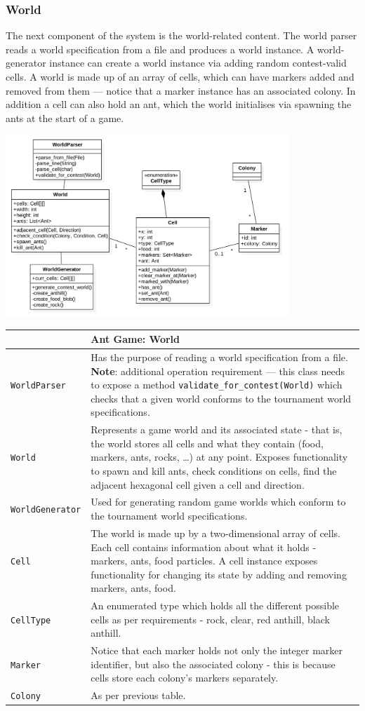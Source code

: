 \documentclass[11pt]{article}
\begin{document}
\subsubsection{World}

The next component of the system is the world-related content. The world parser reads a world specification from a file and produces a world instance. A world-generator instance can create a world instance via adding random contest-valid cells. A world is made up of an array of cells, which can have markers added and removed from them --- notice that a marker instance has an associated colony. In addition a cell can also hold an ant, which the world initialises via spawning the ants at the start of a game. 

\begin{center}
\includegraphics[width=0.8\textwidth]{low-level-diagrams/class/world.png}
\end{center}

\begin{longtable}[c]{@{}p{}p{}@{}}
\toprule
& Ant Game: World \tabularnewline
\midrule
\texttt{WorldParser} & Has the purpose of reading a world specification from a file. \textbf{Note}: additional operation requirement --- this class needs to expose a method \texttt{validate\_for\_contest(World)} which checks that a given world conforms to the tournament world specifications. \tabularnewline
\texttt{World} & Represents a game world and its associated state - that is, the world stores all cells and what they contain (food, markers, ants, rocks, \ldots) at any point. Exposes functionality to spawn and kill ants, check conditions on cells, find the adjacent hexagonal cell given a cell and direction. \tabularnewline
\texttt{WorldGenerator} & Used for generating random game worlds which conform to the tournament world specifications. \tabularnewline
\texttt{Cell} & The world is made up by a two-dimensional array of cells. Each cell contains information about what it holds - markers, ants, food particles. A cell instance exposes functionality for changing its state by adding and removing markers, ants, food. \tabularnewline
\texttt{CellType} & An enumerated type which holds all the different possible cells as per requirements - rock, clear, red anthill, black anthill. \tabularnewline
\texttt{Marker} & Notice that each marker holds not only the integer marker identifier, but also the associated colony - this is because cells store each colony's markers separately. \tabularnewline
\texttt{Colony} & As per previous table. \tabularnewline
\bottomrule
\end{longtable}
\end{document}
